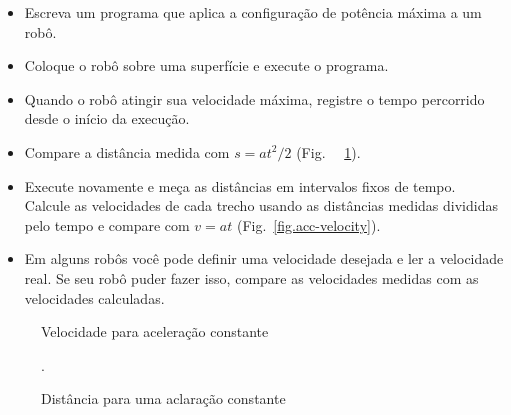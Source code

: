 \begin{framed}
\begin{itemize}
\item Escreva um programa que aplica a configuração de potência máxima a um robô.
\item Coloque o robô sobre uma superfície e execute o programa.
\item Quando o robô atingir sua velocidade máxima, registre o tempo percorrido desde o início da execução.
\item Compare a distância medida com $s = at^2/2$ (Fig.~ ~\ref{fig.acc-distance}).
\item Execute novamente e meça as distâncias em intervalos fixos de tempo. Calcule as velocidades de cada trecho usando as distâncias medidas divididas pelo tempo e compare com $v=at$ (Fig.~\ref{fig.acc-velocity}).
\item Em alguns robôs você pode definir uma velocidade desejada e ler a velocidade real. Se seu robô puder fazer isso, compare as velocidades medidas com as velocidades calculadas.
\end{itemize}
\end{framed}
\begin{figure}
\begin{minipage}{.45\textwidth}
\caption{Velocidade para aceleração constante}\label{fig.acc-velocity}
\end{minipage}
\hspace{\fill}
\begin{minipage}{.45\textwidth}
\caption{Distância para uma aclaração constante}\label{fig.acc-distance}.
\end{minipage}
\end{figure}

